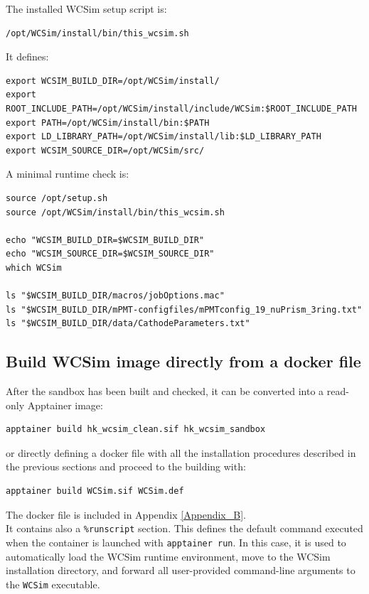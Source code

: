 \documentclass{article}
\numberwithin{table}{subsection}
\numberwithin{figure}{subsection}
\numberwithin{equation}{subsection}
\numberwithin{footnote}{subsection}
\begin{document}
The installed WCSim setup script is:
\begin{lstlisting}[style=terminal]
/opt/WCSim/install/bin/this_wcsim.sh
\end{lstlisting}
It defines:
\begin{lstlisting}[style=terminal]
export WCSIM_BUILD_DIR=/opt/WCSim/install/
export ROOT_INCLUDE_PATH=/opt/WCSim/install/include/WCSim:$ROOT_INCLUDE_PATH
export PATH=/opt/WCSim/install/bin:$PATH
export LD_LIBRARY_PATH=/opt/WCSim/install/lib:$LD_LIBRARY_PATH
export WCSIM_SOURCE_DIR=/opt/WCSim/src/
\end{lstlisting}
A minimal runtime check is:
\begin{lstlisting}[style=terminal]
source /opt/setup.sh
source /opt/WCSim/install/bin/this_wcsim.sh

echo "WCSIM_BUILD_DIR=$WCSIM_BUILD_DIR"
echo "WCSIM_SOURCE_DIR=$WCSIM_SOURCE_DIR"
which WCSim

ls "$WCSIM_BUILD_DIR/macros/jobOptions.mac"
ls "$WCSIM_BUILD_DIR/mPMT-configfiles/mPMTconfig_19_nuPrism_3ring.txt"
ls "$WCSIM_BUILD_DIR/data/CathodeParameters.txt"
\end{lstlisting}

\subsection{Build WCSim image directly from a docker file}
\label{subsec:wcsim_sif}

After the sandbox has been built and checked, it can be converted into a read-only Apptainer image:
\begin{lstlisting}[style=terminal]
apptainer build hk_wcsim_clean.sif hk_wcsim_sandbox
\end{lstlisting}
or directly defining a docker file with all the installation procedures described in the previous sections and proceed to the building with:
\begin{lstlisting}[style=terminal]
apptainer build WCSim.sif WCSim.def
\end{lstlisting}
The docker file is included in Appendix \ref{Appendix_B}.\\
It contains also a \texttt{\%runscript} section. This defines the default command executed when the container is launched with \texttt{apptainer run}. In this case, it is used to automatically load the WCSim runtime environment, move to the WCSim installation directory, and forward all user-provided command-line arguments to the \texttt{WCSim} executable.
\end{document}
